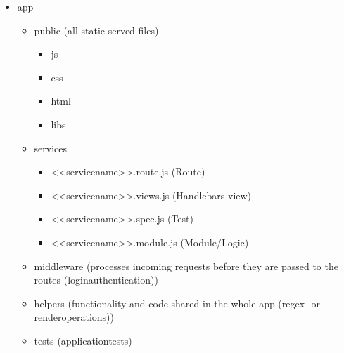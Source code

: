 \documentclass[10pt,a4paper,landscape]{article}
\begin{document}
\begin{itemize}
        \renewcommand{\labelitemi}{$--$}
        \renewcommand{\labelitemii}{$--$}
        \renewcommand{\labelitemiii}{$--$}
        \renewcommand{\labelitemiv}{$--$}
        \item
            app\\
            \begin{itemize}
                    \item
                        public (all static served files)\\
                        \begin{itemize}
                                \item
                                    js\\
                                \item 
                                    css\\
                                \item 
                                    html\\
                                \item
                                    libs\\
                        \end{itemize}
                    \item
                        services\\
                        \begin{itemize}
                                \item
                                    <<servicename>>.route.js (Route)\\
                                \item
                                    <<servicename>>.views.js (Handlebars view)\\
                                \item
                                    <<servicename>>.spec.js (Test)\\
                                \item
                                    <<servicename>>.module.js (Module/Logic)\\
                        \end{itemize}
                    \item
                        middleware (processes incoming requests before they are passed to the routes (loginauthentication))\\
                    \item
                        helpers (functionality and code shared in the whole app (regex- or renderoperations))\\
                    \item
                        tests (applicationtests)\\
            \end{itemize}
\end{itemize}
\renewcommand{\labelitemi}{$\bullet$}
\renewcommand{\labelitemii}{$\cdot$}
\renewcommand{\labelitemiii}{$\diamond$}
\renewcommand{\labelitemiv}{$\ast$}
\end{document}
